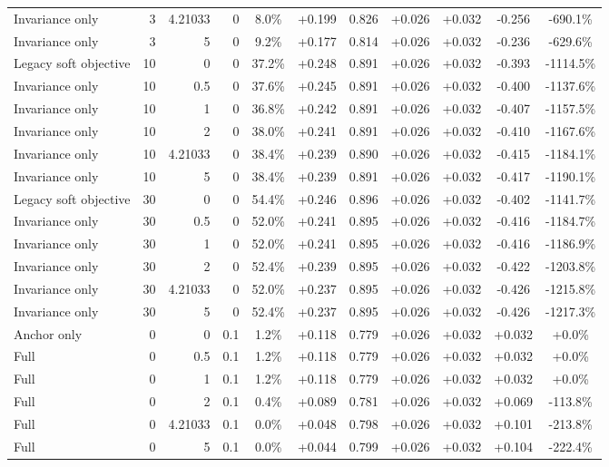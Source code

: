 \begin{table}[htbp]
\begin{tabular}{lrrrccccccc}
Invariance only & 3 & 4.21033 & 0 & 8.0\% & +0.199 & 0.826 & +0.026 & +0.032 & -0.256 & -690.1\% \\
Invariance only & 3 & 5 & 0 & 9.2\% & +0.177 & 0.814 & +0.026 & +0.032 & -0.236 & -629.6\% \\
Legacy soft objective & 10 & 0 & 0 & 37.2\% & +0.248 & 0.891 & +0.026 & +0.032 & -0.393 & -1114.5\% \\
Invariance only & 10 & 0.5 & 0 & 37.6\% & +0.245 & 0.891 & +0.026 & +0.032 & -0.400 & -1137.6\% \\
Invariance only & 10 & 1 & 0 & 36.8\% & +0.242 & 0.891 & +0.026 & +0.032 & -0.407 & -1157.5\% \\
Invariance only & 10 & 2 & 0 & 38.0\% & +0.241 & 0.891 & +0.026 & +0.032 & -0.410 & -1167.6\% \\
Invariance only & 10 & 4.21033 & 0 & 38.4\% & +0.239 & 0.890 & +0.026 & +0.032 & -0.415 & -1184.1\% \\
Invariance only & 10 & 5 & 0 & 38.4\% & +0.239 & 0.891 & +0.026 & +0.032 & -0.417 & -1190.1\% \\
Legacy soft objective & 30 & 0 & 0 & 54.4\% & +0.246 & 0.896 & +0.026 & +0.032 & -0.402 & -1141.7\% \\
Invariance only & 30 & 0.5 & 0 & 52.0\% & +0.241 & 0.895 & +0.026 & +0.032 & -0.416 & -1184.7\% \\
Invariance only & 30 & 1 & 0 & 52.0\% & +0.241 & 0.895 & +0.026 & +0.032 & -0.416 & -1186.9\% \\
Invariance only & 30 & 2 & 0 & 52.4\% & +0.239 & 0.895 & +0.026 & +0.032 & -0.422 & -1203.8\% \\
Invariance only & 30 & 4.21033 & 0 & 52.0\% & +0.237 & 0.895 & +0.026 & +0.032 & -0.426 & -1215.8\% \\
Invariance only & 30 & 5 & 0 & 52.4\% & +0.237 & 0.895 & +0.026 & +0.032 & -0.426 & -1217.3\% \\
Anchor only & 0 & 0 & 0.1 & 1.2\% & +0.118 & 0.779 & +0.026 & +0.032 & +0.032 & +0.0\% \\
Full & 0 & 0.5 & 0.1 & 1.2\% & +0.118 & 0.779 & +0.026 & +0.032 & +0.032 & +0.0\% \\
Full & 0 & 1 & 0.1 & 1.2\% & +0.118 & 0.779 & +0.026 & +0.032 & +0.032 & +0.0\% \\
Full & 0 & 2 & 0.1 & 0.4\% & +0.089 & 0.781 & +0.026 & +0.032 & +0.069 & -113.8\% \\
Full & 0 & 4.21033 & 0.1 & 0.0\% & +0.048 & 0.798 & +0.026 & +0.032 & +0.101 & -213.8\% \\
Full & 0 & 5 & 0.1 & 0.0\% & +0.044 & 0.799 & +0.026 & +0.032 & +0.104 & -222.4\% \\

\end{tabular}
\end{table}
